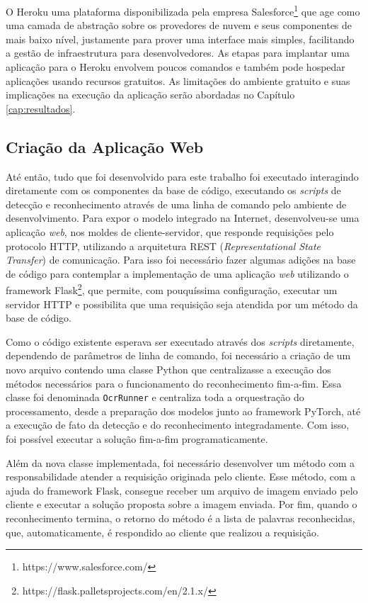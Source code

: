 O Heroku uma plataforma disponibilizada pela empresa Salesforce\footnote{https://www.salesforce.com/} que age como uma camada de abstração sobre os 
provedores de nuvem e seus componentes de mais baixo nível, justamente para prover uma interface mais simples, facilitando a gestão de infraestrutura 
para desenvolvedores. As etapas para implantar uma aplicação para o Heroku envolvem poucos comandos e também pode hospedar aplicações usando recursos 
gratuitos. As limitações do ambiente gratuito e suas implicações na execução da aplicação serão abordadas no Capítulo \ref{cap:resultados}.

\subsection{Criação da Aplicação Web}\label{sec:methodology_web_app}
Até então, tudo que foi desenvolvido para este trabalho foi executado interagindo diretamente com os componentes da base de código, executando os 
\textit{scripts} de detecção e reconhecimento através de uma linha de comando pelo ambiente de desenvolvimento. Para expor o modelo integrado na Internet, 
desenvolveu-se uma aplicação \textit{web}, nos moldes de cliente-servidor, que responde requisições pelo protocolo HTTP, utilizando a arquitetura REST 
(\textit{Representational State Transfer}) de comunicação. Para isso foi necessário fazer algumas adições na base de código para contemplar a 
implementação de uma aplicação \textit{web} utilizando o framework Flask\footnote{https://flask.palletsprojects.com/en/2.1.x/}, que permite, com 
pouquíssima configuração, executar um servidor HTTP e possibilita que uma requisição seja atendida por um método da base de código.

Como o código existente esperava ser executado através dos \textit{scripts} diretamente, dependendo de parâmetros de linha de comando, foi necessário a 
criação de um novo arquivo contendo uma classe Python que centralizasse a execução dos métodos necessários para o funcionamento do reconhecimento 
fim-a-fim. Essa classe foi denominada \texttt{OcrRunner} e centraliza toda a orquestração do processamento, desde a preparação dos modelos junto ao 
framework PyTorch, até a execução de fato da detecção e do reconhecimento integradamente. Com isso, foi possível executar a solução fim-a-fim programaticamente.

Além da nova classe implementada, foi necessário desenvolver um método com a responsabilidade atender a requisição originada pelo cliente. Esse método, 
com a ajuda do framework Flask, consegue receber um arquivo de imagem enviado pelo cliente e executar a solução proposta sobre a imagem enviada. 
Por fim, quando o reconhecimento termina, o retorno do método é a lista de palavras reconhecidas, que, automaticamente, é respondido ao cliente que 
realizou a requisição.

